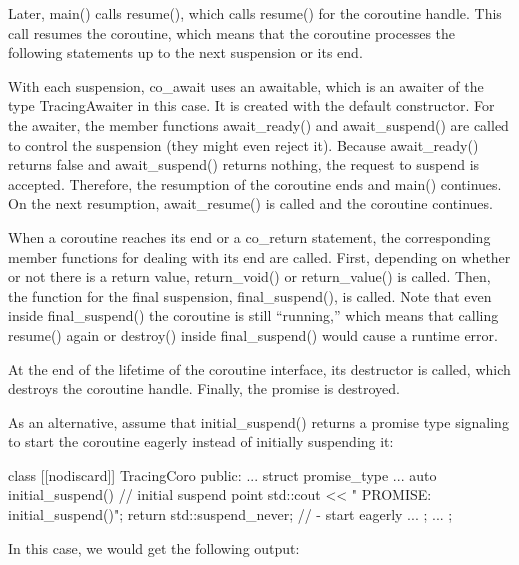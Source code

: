 Later, main() calls resume(), which calls resume() for the coroutine handle. This call resumes the coroutine, which means that the coroutine processes the following statements up to the next suspension or its end.

With each suspension, co\_await uses an awaitable, which is an awaiter of the type TracingAwaiter in this case. It is created with the default constructor. For the awaiter, the member functions await\_ready() and await\_suspend() are called to control the suspension (they might even reject it). Because await\_ready() returns false and await\_suspend() returns nothing, the request to suspend is accepted. Therefore, the resumption of the coroutine ends and main() continues. On the next resumption, await\_resume() is called and the coroutine continues.

When a coroutine reaches its end or a co\_return statement, the corresponding member functions for dealing with its end are called. First, depending on whether or not there is a return value, return\_void() or return\_value() is called. Then, the function for the final suspension, final\_suspend(), is called. Note that even inside final\_suspend() the coroutine is still “running,” which means that calling resume() again or destroy() inside final\_suspend() would cause a runtime error.

At the end of the lifetime of the coroutine interface, its destructor is called, which destroys the coroutine handle. Finally, the promise is destroyed.

As an alternative, assume that initial\_suspend() returns a promise type signaling to start the coroutine eagerly instead of initially suspending it:

\begin{cpp}
class [[nodiscard]] TracingCoro {
	public:
	...
	struct promise_type {
		...
		auto initial_suspend() { // initial suspend point
			std::cout << " PROMISE: initial_suspend()\n";
			return std::suspend_never{}; // - start eagerly
		}
		...
	};
	...
};
\end{cpp}

In this case, we would get the following output:

